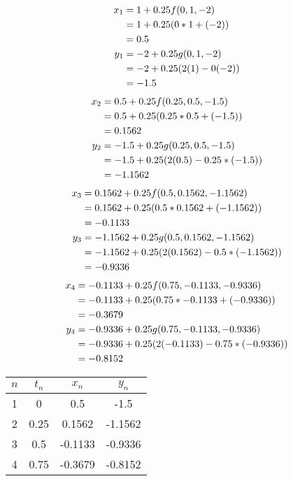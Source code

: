 		\begin{align}
			x_{1} &= 1 + 0.25f(0,1,-2)& \notag \\
			&= 1 + 0.25(0*1 + (-2))& \notag \\
			&= 0.5& \\
			y_{1} &= -2 + 0.25g(0,1,-2)& \notag \\
			&= -2 + 0.25(2(1) - 0(-2))& \notag \\
			&= -1.5&
		\end{align}
		\begin{align}
			x_{2} &= 0.5 + 0.25f(0.25,0.5,-1.5)& \notag \\
			&= 0.5 + 0.25(0.25*0.5 + (-1.5))& \notag \\
			&= 0.1562& \\
			y_{2} &= -1.5 + 0.25g(0.25,0.5,-1.5)& \notag \\
			&= -1.5 + 0.25(2(0.5) - 0.25*(-1.5))& \notag \\
			&= -1.1562&
		\end{align}
		\begin{align}
			x_{3} &= 0.1562 + 0.25f(0.5,0.1562,-1.1562)& \notag \\
			&= 0.1562 + 0.25(0.5*0.1562 + (-1.1562))& \notag \\
			&= -0.1133& \\
			y_{3} &= -1.1562 + 0.25g(0.5,0.1562,-1.1562)& \notag \\
			&= -1.1562 + 0.25(2(0.1562) - 0.5*(-1.1562))& \notag \\
			&= -0.9336&
		\end{align}
		\begin{align}
			x_{4} &= -0.1133 + 0.25f(0.75,-0.1133,-0.9336)& \notag \\
			&= -0.1133 + 0.25(0.75*-0.1133 + (-0.9336))& \notag \\
			&= -0.3679& \\
			y_{4} &= -0.9336 + 0.25g(0.75,-0.1133,-0.9336)& \notag \\
			&= -0.9336 + 0.25(2(-0.1133) - 0.75*(-0.9336))& \notag \\
			&= -0.8152&
		\end{align}

		\begin{table}[H]
			\centering
			\begin{tabular}{|c|c|c|c|}
				\hline
				$n$ & $t_{n}$ & $x_{n}$ & $y_{n}$ \\ \hline
				1 & 0 & 0.5 & -1.5 \\ \hline
				2 & 0.25 & 0.1562 & -1.1562 \\ \hline
				3 & 0.5 & -0.1133 & -0.9336 \\ \hline
				4 & 0.75 & -0.3679 & -0.8152 \\ \hline
			\end{tabular}
		\end{table}

